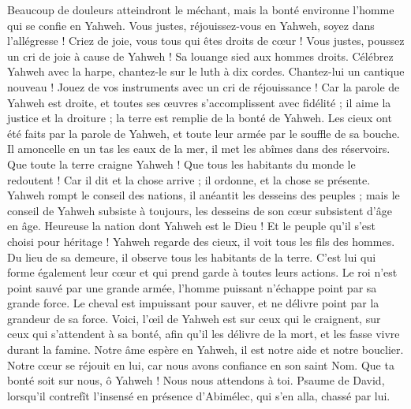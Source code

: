 \begin{multicols}{2}
Beaucoup de douleurs atteindront le méchant, mais la bonté environne l'homme qui se confie en Yahweh.
Vous justes, réjouissez-vous en Yahweh, soyez dans l'allégresse ! Criez de joie, vous tous qui êtes droits de cœur !
\VerseOne{}Vous justes, poussez un cri de joie à cause de Yahweh ! Sa louange sied aux hommes droits.
Célébrez Yahweh avec la harpe, chantez-le sur le luth à dix cordes.
Chantez-lui un cantique nouveau ! Jouez de vos instruments avec un cri de réjouissance !
Car la parole de Yahweh est droite, et toutes ses œuvres s'accomplissent avec fidélité ;
il aime la justice et la droiture ; la terre est remplie de la bonté de Yahweh.
Les cieux ont été faits par la parole de Yahweh, et toute leur armée par le souffle de sa bouche.
Il amoncelle en un tas les eaux de la mer, il met les abîmes dans des réservoirs.
Que toute la terre craigne Yahweh ! Que tous les habitants du monde le redoutent !
Car il dit et la chose arrive ; il ordonne, et la chose se présente.
Yahweh rompt le conseil des nations, il anéantit les desseins des peuples ;
mais le conseil de Yahweh subsiste à toujours, les desseins de son cœur subsistent d'âge en âge.
Heureuse la nation dont Yahweh est le Dieu ! Et le peuple qu'il s'est choisi pour héritage !
Yahweh regarde des cieux, il voit tous les fils des hommes.
Du lieu de sa demeure, il observe tous les habitants de la terre.
C'est lui qui forme également leur cœur et qui prend garde à toutes leurs actions.
Le roi n'est point sauvé par une grande armée, l'homme puissant n'échappe point par sa grande force.
Le cheval est impuissant pour sauver, et ne délivre point par la grandeur de sa force.
Voici, l'œil de Yahweh est sur ceux qui le craignent, sur ceux qui s'attendent à sa bonté,
afin qu'il les délivre de la mort, et les fasse vivre durant la famine.
Notre âme espère en Yahweh, il est notre aide et notre bouclier.
Notre cœur se réjouit en lui, car nous avons confiance en son saint Nom.
Que ta bonté soit sur nous, ô Yahweh ! Nous nous attendons à toi.
\VerseOne{}Psaume de David, lorsqu'il contrefît l'insensé en présence d'Abimélec, qui s'en alla, chassé par lui.

\end{multicols}
